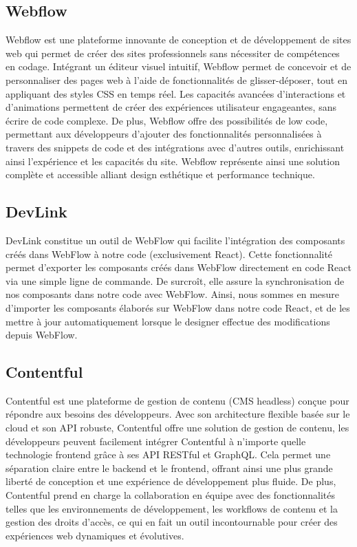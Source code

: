 \subsection{Webflow}
Webflow est une plateforme innovante de conception et de développement de sites web qui permet de créer des sites professionnels sans nécessiter de compétences en codage. Intégrant un éditeur visuel intuitif, Webflow permet de concevoir et de personnaliser des pages web à l'aide de fonctionnalités de glisser-déposer, tout en appliquant des styles CSS en temps réel. Les capacités avancées d'interactions et d'animations permettent de créer des expériences utilisateur engageantes, sans écrire de code complexe. De plus, Webflow offre des possibilités de low code, permettant aux développeurs d'ajouter des fonctionnalités personnalisées à travers des snippets de code et des intégrations avec d'autres outils, enrichissant ainsi l'expérience et les capacités du site. Webflow représente ainsi une solution complète et accessible alliant design esthétique et performance technique.

\subsection{DevLink}
DevLink constitue un outil de WebFlow qui facilite l'intégration des composants créés dans WebFlow à notre code (exclusivement React). Cette fonctionnalité permet d'exporter les composants créés dans WebFlow directement en code React via une simple ligne de commande. De surcroît, elle assure la synchronisation de nos composants dans notre code avec WebFlow. Ainsi, nous sommes en mesure d'importer les composants élaborés sur WebFlow dans notre code React, et de les mettre à jour automatiquement lorsque le designer effectue des modifications depuis WebFlow. 

\subsection{Contentful}
Contentful est une plateforme de gestion de contenu (CMS headless) conçue pour répondre aux besoins des développeurs. Avec son architecture flexible basée sur le cloud et son API robuste, Contentful offre une solution de gestion de contenu, les développeurs peuvent facilement intégrer Contentful à n'importe quelle technologie frontend grâce à ses API RESTful et GraphQL. Cela permet une séparation claire entre le backend et le frontend, offrant ainsi une plus grande liberté de conception et une expérience de développement plus fluide. De plus, Contentful prend en charge la collaboration en équipe avec des fonctionnalités telles que les environnements de développement, les workflows de contenu et la gestion des droits d'accès, ce qui en fait un outil incontournable pour créer des expériences web dynamiques et évolutives.

